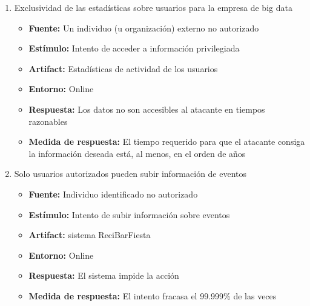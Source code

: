 \begin{enumerate}
\item Exclusividad de las estadísticas sobre usuarios para la empresa de big data
  \begin{itemize}
    \item \textbf{\textbf{Fuente:}} Un individuo (u organización) externo no autorizado
    \item \textbf{\textbf{Estímulo:}} Intento de acceder a información privilegiada
    \item \textbf{\textbf{Artifact:}} Estadísticas de actividad de los usuarios
    \item \textbf{\textbf{Entorno:}} Online
    \item \textbf{\textbf{Respuesta:}} Los datos no son accesibles al atacante en tiempos razonables
    \item \textbf{\textbf{Medida de respuesta:}} El tiempo requerido para que el atacante consiga la información deseada está, al menos, en el orden de años
  \end{itemize}

\item Solo usuarios autorizados pueden subir información de eventos
  \begin{itemize}
    \item \textbf{\textbf{Fuente:}} Individuo identificado no autorizado
    \item \textbf{\textbf{Estímulo:}} Intento de subir información sobre eventos
    \item \textbf{\textbf{Artifact:}} sistema ReciBarFiesta
    \item \textbf{\textbf{Entorno:}} Online
    \item \textbf{\textbf{Respuesta:}} El sistema impide la acción
    \item \textbf{\textbf{Medida de respuesta:}} El intento fracasa el 99.999\% de las veces
  \end{itemize}


\end{enumerate}
